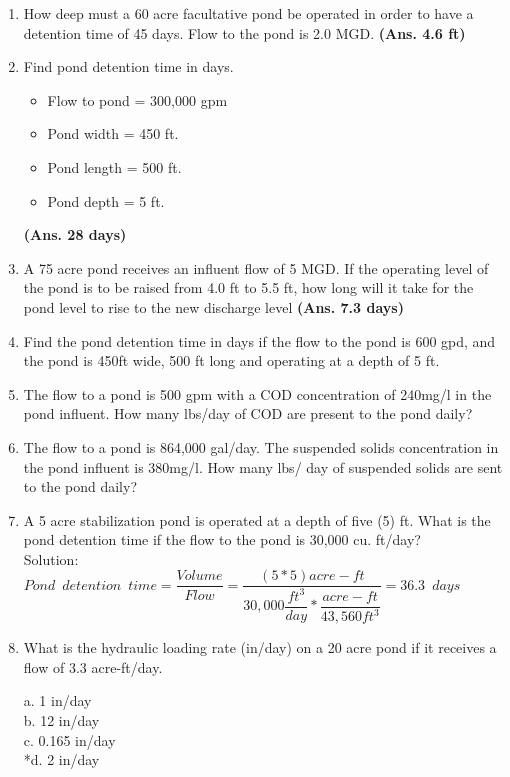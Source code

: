 \begin{enumerate}
\item How deep must a 60 acre facultative pond be operated in order to have a detention time of 45 days. Flow to the pond is 2.0 MGD. \textbf{(Ans. 4.6 ft)}


\item Find pond detention time in days.
\begin{itemize}
\item Flow to pond = 300,000 gpm
\item Pond width = 450 ft.
\item Pond length = 500 ft.
\item Pond depth = 5 ft.
\end{itemize}
\textbf{(Ans. 28 days)}


\item A 75 acre pond receives an influent flow of 5 MGD.  If the operating level of the pond is to be raised from 4.0 ft to 5.5 ft, how long will it take for the pond level to rise to the new discharge level \textbf{(Ans. 7.3 days)}


\item Find the pond detention time in days if the flow to the pond is 600 gpd, and the pond is 450ft wide, 500 ft long and operating at a depth of 5 ft.


\item The flow to a pond is 500 gpm with a COD concentration of 240mg/l in the pond influent. How many lbs/day of COD are present to the pond daily?


\item The flow to a pond is 864,000 gal/day. The suspended solids concentration in the pond influent is 380mg/l. How many lbs/ day of suspended solids are sent to the pond daily?

\item  A 5 acre stabilization pond is operated at a depth of five (5) ft.  What is the pond detention time if the flow to the pond is 30,000 cu. ft/day? \\
\vspace{0.3cm}
Solution:\\
$Pond \enspace detention \enspace time=\dfrac{Volume}{Flow}=\dfrac{(5*5)acre-ft}{30,000\dfrac{ft^3}{day}*\dfrac{acre-ft}{43,560ft^3}}=\boxed{36.3 \enspace days}$\\

\item  What is the hydraulic loading rate (in/day) on a 20 acre pond if it receives a flow of 3.3 acre-ft/day. 

a. 1 in/day \\
b. 12 in/day \\
c. 0.165 in/day \\
*d. 2 in/day 


\end{enumerate}
